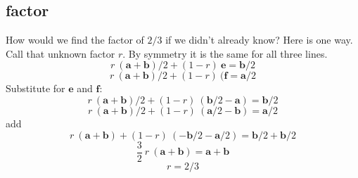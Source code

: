 \documentclass[11pt, oneside]{article}
\begin{document}
\subsection*{factor}
How would we find the factor of $2/3$ if we didn't already know?  Here is one way.  Call that unknown factor $r$.  By symmetry it is the same for all three lines.
\[ r \ (\mathbf{a} + \mathbf{b})/2 + (1-r) \ \mathbf{e} = \mathbf{b} / 2 \]
\[ r \ (\mathbf{a} + \mathbf{b})/2 + (1-r) \ (\mathbf{f} = \mathbf{a} / 2 \]
Substitute for $\mathbf{e}$ and $\mathbf{f}$:
\[ r \ (\mathbf{a} + \mathbf{b})/2 + (1-r) \ (\mathbf{b}/2 - \mathbf{a}) = \mathbf{b} / 2 \]
\[ r \ (\mathbf{a} + \mathbf{b})/2 + (1-r) \ (\mathbf{a}/2 - \mathbf{b}) = \mathbf{a} / 2 \]
add
\[ r \ (\mathbf{a} + \mathbf{b}) + (1-r) \ (-\mathbf{b}/2 - \mathbf{a}/2) = \mathbf{b} / 2 + \mathbf{b} / 2 \]
\[ \frac{3}{2} \ r \ (\mathbf{a} + \mathbf{b}) = \mathbf{a} + \mathbf{b} \]
\[ r = 2/3 \]
\end{document}
